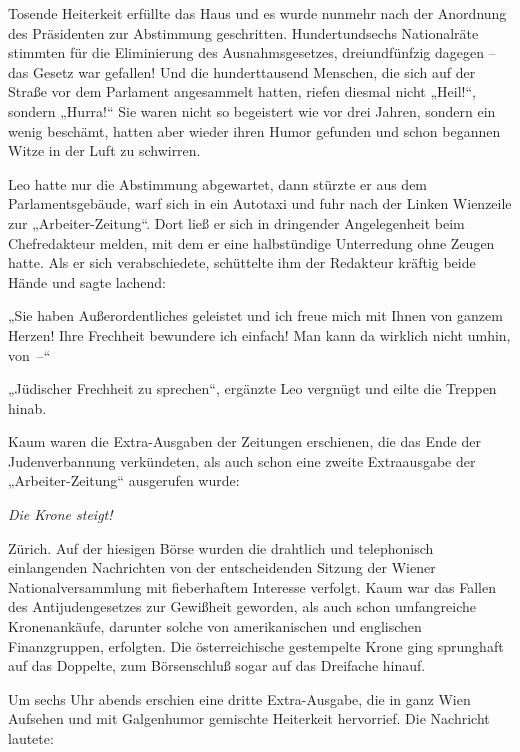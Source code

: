 Tosende Heiterkeit erfüllte das Haus und es wurde nunmehr nach der
Anordnung des Präsidenten zur Abstimmung geschritten.
Hundertundsechs Nationalräte stimmten für die Eliminierung des
Ausnahmsgesetzes, dreiundfünfzig dagegen – das Gesetz war gefallen!
Und die hunderttausend Menschen, die sich auf der Straße vor dem
Parlament angesammelt hatten, riefen diesmal nicht „Heil!“, sondern
„Hurra!“ Sie waren nicht so begeistert wie vor drei Jahren, sondern
ein wenig beschämt, hatten aber wieder ihren Humor gefunden und
schon begannen Witze in der Luft zu schwirren.

Leo hatte nur die Abstimmung abgewartet, dann stürzte er aus dem
Parlamentsgebäude, warf sich in ein Autotaxi und fuhr nach der
Linken Wienzeile zur „Arbeiter-Zeitung“. Dort ließ er sich in
dringender Angelegenheit beim Chefredakteur melden, mit dem er eine
halbstündige Unterredung ohne Zeugen hatte. Als er sich
verabschiedete, schüttelte ihm der Redakteur kräftig beide Hände
und sagte lachend:

„Sie haben Außerordentliches geleistet und ich freue mich mit Ihnen
von ganzem Herzen! Ihre Frechheit bewundere ich einfach! Man kann
da wirklich nicht umhin, von~–“

„Jüdischer Frechheit zu sprechen“, ergänzte Leo vergnügt und eilte
die Treppen hinab.

\tb{* * *}
Kaum waren die Extra-Ausgaben der Zeitungen
erschienen, die das Ende der Judenverbannung verkündeten, als auch
schon eine zweite Extraausgabe der „Arbeiter-Zeitung“ ausgerufen
wurde:

\begin{center}
\textit{Die Krone steigt!}

\end{center}
Zürich. Auf der hiesigen Börse wurden die drahtlich und
telephonisch einlangenden Nachrichten von der entscheidenden
Sitzung der Wiener Nationalversammlung mit fieberhaftem Interesse
verfolgt. Kaum war das Fallen des Antijudengesetzes zur Gewißheit
geworden, als auch schon umfangreiche Kronenankäufe, darunter
solche von amerikanischen und englischen Finanzgruppen, erfolgten.
Die österreichische gestempelte Krone ging sprunghaft auf das
Doppelte, zum Börsenschluß sogar auf das Dreifache hinauf.

Um sechs Uhr abends erschien eine dritte Extra-Ausgabe, die in ganz
Wien Aufsehen und mit Galgenhumor gemischte Heiterkeit hervorrief.
Die Nachricht lautete:


